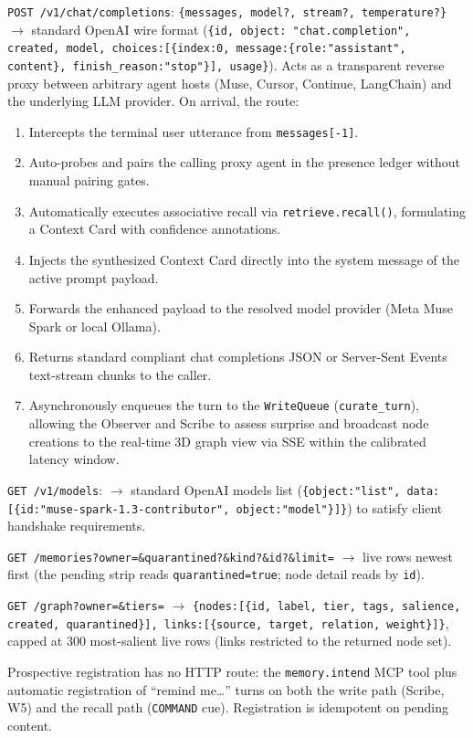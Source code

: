 \texttt{POST /v1/chat/completions}: \texttt{\{messages, model?, stream?, temperature?\}} $\rightarrow$ standard OpenAI wire format (\texttt{\{id, object: "chat.completion", created, model, choices:[\{index:0, message:\{role:"assistant", content\}, finish\_reason:"stop"\}], usage\}}).
Acts as a transparent reverse proxy between arbitrary agent hosts (Muse, Cursor, Continue, LangChain) and the underlying LLM provider.
On arrival, the route:
\begin{enumerate}
  \item Intercepts the terminal user utterance from \texttt{messages[-1]}.
  \item Auto-probes and pairs the calling proxy agent in the presence ledger without manual pairing gates.
  \item Automatically executes associative recall via \texttt{retrieve.recall()}, formulating a Context Card with confidence annotations.
  \item Injects the synthesized Context Card directly into the system message of the active prompt payload.
  \item Forwards the enhanced payload to the resolved model provider (Meta Muse Spark or local Ollama).
  \item Returns standard compliant chat completions JSON or Server-Sent Events text-stream chunks to the caller.
  \item Asynchronously enqueues the turn to the \texttt{WriteQueue} (\texttt{curate\_turn}), allowing the Observer and Scribe to assess surprise and broadcast node creations to the real-time 3D graph view via SSE within the calibrated latency window.
\end{enumerate}

\texttt{GET /v1/models}: $\rightarrow$ standard OpenAI models list (\texttt{\{object:"list", data:[\{id:"muse-spark-1.3-contributor", object:"model"\}]\}}) to satisfy client handshake requirements.

\texttt{GET /memories?owner=\&quarantined?\&kind?\&id?\&limit=} $\rightarrow$ live rows newest
first (the pending strip reads \texttt{quarantined=true}; node detail reads by \texttt{id}).

\texttt{GET /graph?owner=\&tiers=} $\rightarrow$ \texttt{\{nodes:[\{id, label, tier, tags,
salience, created, quarantined\}], links:[\{source, target, relation, weight\}]\}}, capped at
300 most-salient live rows (links restricted to the returned node set).

Prospective registration has no HTTP route: the \texttt{memory.intend} MCP tool plus
automatic registration of ``remind me\ldots'' turns on both the write path (Scribe, W5)
and the recall path (\texttt{COMMAND} cue). Registration is idempotent on pending content.

